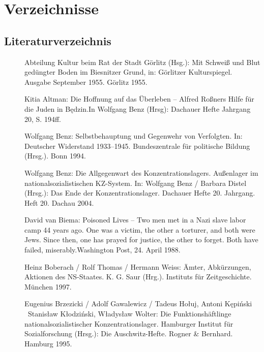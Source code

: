 \chapter{Verzeichnisse}
\section*{Literaturverzeichnis}
%

\begin{description}
\item[]{Abteilung Kultur beim Rat der Stadt Görlitz (Hsg.): \glqq Mit Schweiß und Blut gedüngter Boden im Biesnitzer Grund\grqq, in: \glqq Görlitzer Kulturspiegel\grqq. Ausgabe September 1955. Görlitz 1955.}

\item[]{Kitia Altman: \glqq Die Hoffnung auf das Überleben -- Alfred Roßners Hilfe für die Juden in Będzin.\grqq In Wolfgang Benz (Hrsg): Dachauer Hefte Jahrgang 20, S. 194ff.}

\item[]{Wolfgang Benz: \glqq Selbstbehauptung und Gegenwehr von Verfolgten\grqq. In: \glqq Deutscher Widerstand 1933--1945\grqq. Bundeszentrale für politische Bildung (Hrsg.). Bonn 1994.}

\item[]{Wolfgang Benz: \glqq Die Allgegenwart des Konzentrationslagers. Außenlager im nationalsozialistischen KZ-System\grqq. In: Wolfgang Benz / Barbara Distel (Hrsg.): \glqq Das Ende der Konzentrationslager\grqq. Dachauer Hefte 20. Jahrgang. Heft 20. Dachau 2004. }

\item[]{David van Biema: \glqq Poisoned Lives -- Two men met in a Nazi slave labor camp 44 years ago. One was a victim, the other a torturer, and both were Jews. Since then, one has prayed for justice, the other to forget. Both have failed, miserably.\grqq Washington Post, 24. April 1988.}

\item[]{Heinz Boberach / Rolf Thomas / Hermann Weiss: \glqq Ämter, Abkürzungen, Aktionen des NS-Staates\grqq. K. G. Saur (Hrg.). Instituts für Zeitgeschichte. München 1997.}

\item[]{Eugenius Brzezicki / Adolf Gawalewicz / Tadeus Ho\l uj, Antoni Kępiński \ Stanis\l aw K\l odziński, W\l adys\l aw Wolter: \glqq Die Funktionshäftlinge nationalsozialistischer Konzentrationslager\grqq. 
Hamburger Institut für Sozialforschung (Hrsg.): \glqq Die Auschwitz-Hefte\grqq. Rogner \& Bernhard. Hamburg 1995.}


\end{description}

